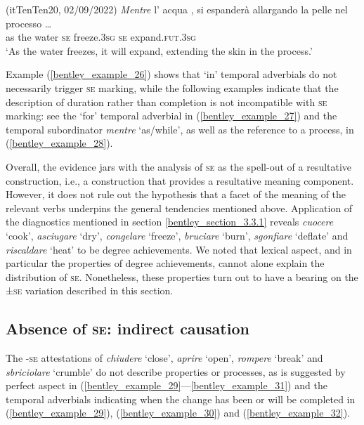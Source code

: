 \documentclass[output=paper,colorlinks,citecolor=brown
]{langscibook}
\begin{document}
\hspace*{\fill}(itTenTen20, 02/09/2022)\quad
\ea \label{bentley_example_28}
    \gll \textit{Mentre}	l’		acqua		
    ,			si		espanderà {	allargando la pelle
      nel processo \ldots}\\
    	as						the	water		\textsc{se}		freeze.3\textsc{sg}		\textsc{se}		expand.\textsc{fut}.3\textsc{sg} {} \\
    \glt 	‘As the water freezes, it will expand, extending the skin in the process.’
\z

Example (\ref{bentley_example_26}) shows that ‘in’ temporal adverbials do not necessarily trigger \textsc{se} marking, while the following examples indicate that the description of duration rather than completion is not incompatible with \textsc{se} marking: see the ‘for’ temporal adverbial in (\ref{bentley_example_27}) and the temporal subordinator \textit{mentre} ‘as/while’, as well as the reference to a process, in (\ref{bentley_example_28}). 

Overall, the evidence jars with the analysis of \textsc{se} as the spell-out of a resultative construction, i.e., a construction that provides a resultative meaning component. However, it does not rule out the hypothesis that a facet of the meaning of the relevant verbs underpins the general tendencies mentioned above. Application of the diagnostics mentioned in section \ref{bentley_section_3.3.1} reveals \textit{cuocere} ‘cook’, \textit{asciugare} ‘dry’, \textit{congelare} ‘freeze’, \textit{bruciare} ‘burn’, \textit{sgonfiare} ‘deflate’ and \textit{riscaldare} ‘heat’ to be degree achievements. We noted that lexical aspect, and in particular the properties of degree achievements, cannot alone explain the distribution of \textsc{se}. Nonetheless, these properties turn out to have a bearing on the ±\textsc{se} variation described in this section. 

\subsection{Absence of \textsc{se}: indirect causation}
\label{bentley_section_4.2}
The -\textsc{se} attestations of \textit{chiudere} ‘close’, \textit{aprire} ‘open’, \textit{rompere} ‘break’ and \textit{sbriciolare} ‘crumble’ do not describe properties or processes, as is suggested by perfect aspect in (\ref{bentley_example_29}—\ref{bentley_example_31}) and the temporal adverbials indicating when the change has been or will be completed in (\ref{bentley_example_29}), (\ref{bentley_example_30}) and (\ref{bentley_example_32}).
\end{document}
